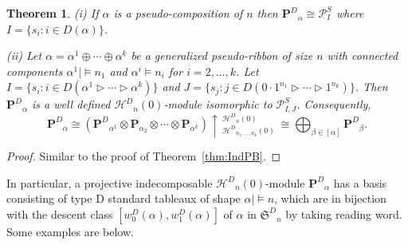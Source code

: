 \documentclass{amsart}
\newtheorem{theorem}{Theorem}[section]
\newtheorem*{Young's Rule}{Young's Rule}
\theoremstyle{definition}
\theoremstyle{remark}
\numberwithin{equation}{section}
\begin{document}
\begin{theorem}\label{thm:IndPD}
(i) If $\alpha$ is a pseudo-composition of $n$ then ${\mathbf{P}^D}_\alpha \cong {\mathcal{P}}_I^S$ where $I=\{s_i:i\in D(\alpha)\}$.

\noindent(ii) Let $\alpha=\alpha^1 \oplus \cdots \oplus \alpha^k$ be a generalized pseudo-ribbon of size $n$ with connected components $\alpha^1\mid\models n_1$ and $\alpha^i \models n_i$ for $i=2,\ldots,k$. Let $I=\{s_i: i\in D(\alpha^1\rhd\cdots\rhd \alpha^k)\}$ and $J=\{s_j:j\in D(0\cdot1^{n_1}\rhd\cdots\rhd 1^{n_k}) \}$. Then ${\mathbf{P}^D}_\alpha$ is a well defined ${\mathcal{H}^D}_n(0)$-module isomorphic to ${\mathcal{P}_{I,J}^S}$. Consequently,
\[ {\mathbf{P}^D}_\alpha \cong \left({\mathbf{P}^D}_{\alpha^1}\otimes{\mathbf{P}}_{\alpha_2}\otimes\cdots\otimes {\mathbf{P}}_{\alpha^k}\right)
\uparrow\,_{{\mathcal{H}^D}_{n_1,\ldots,n_k}(0)}^{{\mathcal{H}^D}_n(0)}\ \cong
\bigoplus_{\beta\in[\alpha]}{\mathbf{P}^D}_\beta. \]
\end{theorem}

\begin{proof}
Similar to the proof of Theorem~\ref{thm:IndPB}.
\end{proof}

In particular, a projective indecomposable ${\mathcal{H}^D}_n(0)$-module ${\mathbf{P}^D}_\alpha$ has a basis consisting of type D standard tableaux of shape $\alpha\mid\models n$, which are in bijection with the descent class $[w^D_0(\alpha),w^D_1(\alpha)]$ of $\alpha$ in ${{\mathfrak S}^D}_n$ by taking reading word. Some examples are below.
\end{document}

